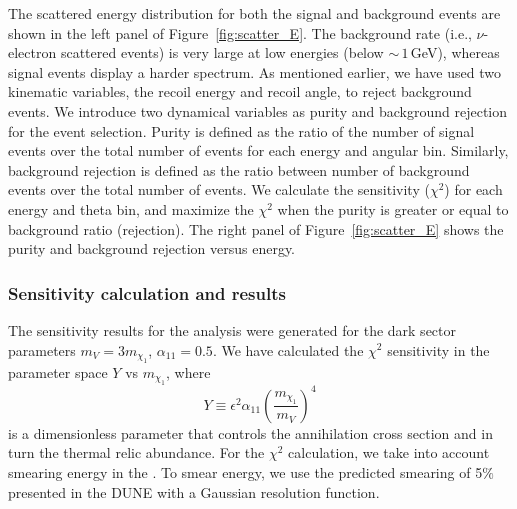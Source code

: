 The scattered energy distribution for both the signal and background events are shown in the left panel of Figure~\ref{fig:scatter_E}.
The background rate (i.e., $\nu$-electron scattered events) is very large at low energies (below $\sim\,1\,$GeV), whereas signal events display a harder spectrum. 
As mentioned earlier,  we have used two kinematic variables, the recoil energy and recoil angle, to reject background events. 
We introduce two dynamical variables as purity and background rejection for the event selection. 
Purity is defined as the ratio of the number of signal events over the total number of events for each energy and angular bin. 
Similarly, background rejection is defined as the ratio between number of background events over the total number of events. 
We calculate the sensitivity ($\chi^{2}$) for each energy and theta bin, and maximize the $\chi^{2}$ when the purity is greater or equal to background ratio (rejection). The right panel of Figure~\ref{fig:scatter_E} shows the purity and background rejection versus energy.

\subsubsection{Sensitivity calculation and results}
The sensitivity results for the analysis were generated for the dark sector parameters  $m_{V}=3m_{\chi_1}$, $\alpha_{11}=0.5$. 
We have calculated the $\chi^{2}$ sensitivity in the parameter space $Y$ vs $m_{\chi_1}$, where 
\begin{equation}
Y\equiv\epsilon^{2}\alpha_{11} (\frac{m_{\chi_1}}{m_{V}})^{4}
\end{equation}
is a dimensionless parameter that controls the  annihilation cross section and in turn the thermal relic abundance. 
For the $\chi^{2}$ calculation, we take into account smearing energy in the  .
To smear energy, we use the predicted smearing of 5$\%$ presented in the DUNE  \cite{Acciarri:2015uup} with a Gaussian resolution function.


